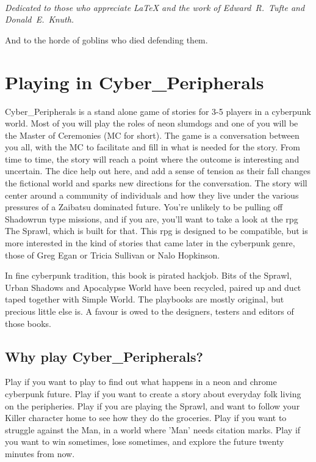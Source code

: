 \documentclass{tufte-book}
\begin{document}
\tableofcontents

\listoffigures

\listoftables

\cleardoublepage
~\vfill
\begin{doublespace}
\noindent\fontsize{18}{22}\selectfont\itshape
\nohyphenation
Dedicated to those who appreciate \LaTeX{} 
and the work of \mbox{Edward R.~Tufte} 
and \mbox{Donald E.~Knuth}.

And to the horde of goblins who died defending them.
\end{doublespace}
\vfill
\vfill


\cleardoublepage
\chapter*{Playing in Cyber\_Peripherals}
\label{ch:playing in Cyber_Peripherals}
Cyber\_Peripherals is a stand alone game of stories for 3-5 players in a cyberpunk world. Most of you will play the roles of neon slumdogs and one of you will be the Master of Ceremonies (MC for short). The game is a conversation between you all, with the MC to facilitate and fill in what is needed for the story. From time to time, the story will reach a point where the outcome is interesting and uncertain. The dice help out here, and add a sense of tension as their fall changes the fictional world and sparks new directions for the conversation.
The story will center around a community of individuals and how they live under the various pressures of a Zaibatsu dominated future. You're unlikely to be pulling off Shadowrun type missions, and if you are, you'll want to take a  look at the rpg The Sprawl, which is built for that. This rpg is designed to be compatible, but is more interested in the kind of stories that came later in the cyberpunk genre, those of Greg Egan or Tricia Sullivan or Nalo Hopkinson. 

In fine cyberpunk tradition, this book is pirated hackjob. Bits of the Sprawl, Urban Shadows and Apocalypse World have been recycled, paired up and duct taped together with Simple World. The playbooks are mostly original, but precious little else is. A favour is owed to the designers, testers and editors of those books.

\section {Why play Cyber\_Peripherals?}
Play if you want to play to find out what happens in a neon and chrome cyberpunk future.
Play if you want to create a story about everyday folk living on the peripheries.
Play if you are playing the Sprawl, and want to follow your Killer character home to see how they do the groceries.
Play if you want to struggle against the Man, in a world where 'Man' needs citation marks.
Play if you want to win sometimes, lose sometimes, and explore the future twenty minutes from now.
\end{document}
